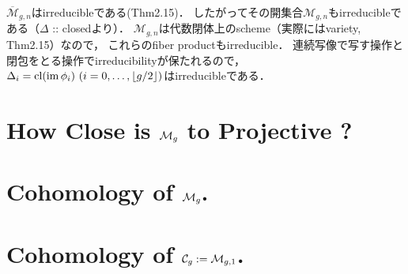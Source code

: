 \documentclass[a4paper]{jsarticle}
\newcommand{\tp}[2]{\texorpdfstring{#1}{#2}}
\newcommand{\modC}{\mathcal{C}}
\newcommand{\M}{\mathcal{M}}
\newcommand{\barM}{\overline{\mathcal{M}}}
\begin{document}
        $\barM_{g,n}$はirreducibleである(Thm2.15)．
        したがってその開集合$\M_{g,n}$もirreducibleである（$\Delta$ :: closedより）．
        $\M_{g,n}$は代数閉体上のscheme（実際にはvariety, Thm2.15）なので，
        これらのfiber productもirreducible．
        連続写像で写す操作と閉包をとる操作でirreducibilityが保たれるので，
        $\Delta_i=\operatorname{cl}(\operatorname{im} \phi_i) \ (i=0,\dots,\lfloor g/2 \rfloor)$はirreducibleである．
        
\section{How Close is \tp{$\mathcal{M}_g$}{Mg} to Projective ?}

\section{Cohomology of \tp{$\mathcal{M}_g$}{Mg}.}

\section{Cohomology of \tp{$\modC_g:=\modM_{g, 1}$}{Cg=Mg,1}.}



\end{document}
